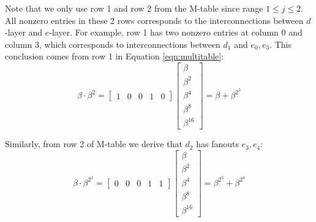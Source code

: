 \begin{Example}
\begin{figure}[H]
\end{figure}

Note that we only use row 1 and row 2 from the M-table since range $1\leq j \leq 2$.
All nonzero entries in these 2 rows corresponds to the interconnections between $d$-layer and 
$e$-layer. For example, row 1 has two nonzero entries at column 0 and column 3, which corresponds to interconnections 
between $d_1$ and $e_0,e_3$. This conclusion comes from row 1 in Equation \ref{eqn:multitable}:
\begin{equation*}
\beta\cdot\beta^2 = 
\begin{bmatrix}
1 & 0 & 0 & 1 & 0
\end{bmatrix}
\begin{bmatrix}
\beta \\ \beta^2 \\ \beta^4 \\ \beta^8 \\ \beta^{16}
\end{bmatrix}
= \beta + \beta^{2^3}
\end{equation*}

Similarly, from row 2 of M-table we derive that $d_2$ has fanouts $e_3,e_4$:
\begin{equation*}
\beta\cdot\beta^{2^2} = 
\begin{bmatrix}
0 & 0 & 0 & 1 & 1
\end{bmatrix}
\begin{bmatrix}
\beta \\ \beta^2 \\ \beta^4 \\ \beta^8 \\ \beta^{16}
\end{bmatrix}
= \beta^{2^3} + \beta^{2^4}
\end{equation*}


\end{Example}
